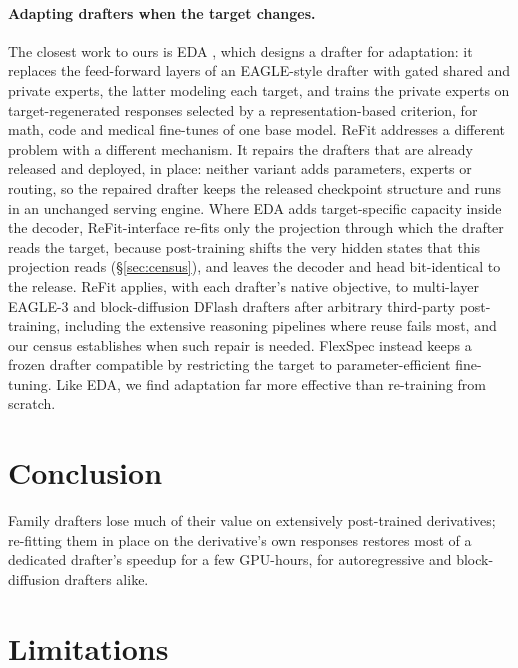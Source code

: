 \documentclass[11pt]{article}
\newcommand{\refit}{ReFit}
\newcommand{\refitI}{ReFit-interface}
\begin{document}
\paragraph{Adapting drafters when the target changes.}
The closest work to ours is EDA \citep{lin2026eda}, which designs a drafter for adaptation: it replaces the feed-forward layers of an EAGLE-style drafter with gated shared and private experts, the latter modeling each target, and trains the private experts on target-regenerated responses selected by a representation-based criterion, for math, code and medical fine-tunes of one base model.
\refit{} addresses a different problem with a different mechanism.
It repairs the drafters that are already released and deployed, in place: neither variant adds parameters, experts or routing, so the repaired drafter keeps the released checkpoint structure and runs in an unchanged serving engine.
Where EDA adds target-specific capacity inside the decoder, \refitI{} re-fits only the projection through which the drafter reads the target, because post-training shifts the very hidden states that this projection reads (\S\ref{sec:census}), and leaves the decoder and head bit-identical to the release.
\refit{} applies, with each drafter's native objective, to multi-layer EAGLE-3 and block-diffusion DFlash drafters after arbitrary third-party post-training, including the extensive reasoning pipelines where reuse fails most, and our census establishes when such repair is needed.
FlexSpec \citep{li2026flexspec} instead keeps a frozen drafter compatible by restricting the target to parameter-efficient fine-tuning.
Like EDA, we find adaptation far more effective than re-training from scratch.


\section{Conclusion}

Family drafters lose much of their value on extensively post-trained derivatives; re-fitting them in place on the derivative's own responses restores most of a dedicated drafter's speedup for a few GPU-hours, for autoregressive and block-diffusion drafters alike.

\section*{Limitations}
\end{document}
